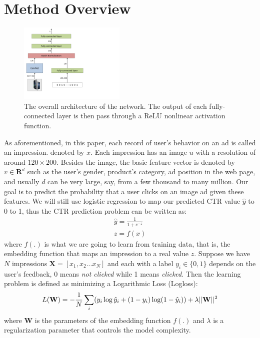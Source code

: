 \documentclass{sig-alternate}
\begin{document}
\section{Method Overview}\label{Overview}
\begin{figure}
	\centering
	\includegraphics[width=0.45\textwidth]{pic}
	\caption{The overall architecture of the network. The output of each fully-connected layer is then pass through a ReLU nonlinear activation function.}
	\label{fig:net}
\end{figure}
As aforementioned,
in this paper, each record of user's behavior on an ad is called an impression. denoted by $x$. Each impression has an image $u$ with a resolution of around $120 \times 200$. Besides the image, the basic feature vector is denoted by $v \in \mathbf{R}^{d}$ such as the  user's gender, product's category, ad position in the web page, and usually $d$ can be very large, say, from a few thousand to many million.
Our goal is to predict the probability that a user clicks on an image ad given these features. We will still use logistic regression to map our predicted CTR value $\hat{y}$ to 0 to 1, thus the CTR prediction problem can be written as:
\begin{gather}
\hat{y} = \frac{1}{1+e^{-z}} \\
z = f(x)
\end{gather}
where $f(.)$ is what we are going to learn from training data, that is, the embedding function that maps an impression to a real value $z$.  Suppose we have $N$ impressions $\mathbf{X}=[x_{1}, x_{2}...x_{N}]$ and each with a label $y_{i} \in \{0,1\}$ depends on the user's feedback, 0 means \emph{not clicked} while 1 means \emph{clicked}. Then the learning problem is defined as minimizing a Logarithmic Loss (Logloss):
\begin{equation}
L(\mathbf{W}) = -\frac{1}{N} \sum_{i} (y_{i} \log \hat{y}_{i} + (1-y_{i}) \log (1-\hat{y}_{i}) )  \\ + \lambda || \mathbf{W}||^{2}
\end{equation}
where $\mathbf{W}$ is the parameters of the embedding function $f(.) $ and $\lambda$ is a regularization parameter that controls the model complexity.
\end{document}
